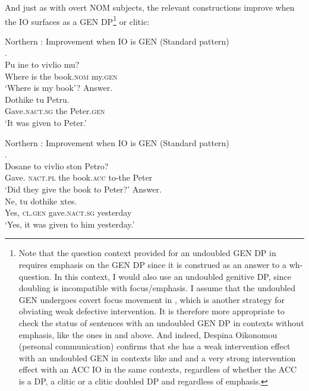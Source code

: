 \documentclass[output=paper]{LSP/langsci}
\begin{document}
And just as with overt NOM subjects, the relevant  constructions improve when the IO surfaces as a GEN DP\footnote{Note that the question context provided for an undoubled GEN DP in  requires emphasis on the GEN DP since it is construed as an answer to a wh-question. In this context, I would also use an undoubled genitive DP, since doubling is incompatible with focus/emphasis. I assume that the undoubled GEN undergoes covert focus movement in , which is another strategy for obviating weak defective intervention. It is therefore more appropriate to check the status of sentences with an undoubled GEN DP in contexts without emphasis, like the ones in  and  above. And indeed, Despina Oikonomou (personal communication) confirms that she has a weak intervention effect with an undoubled GEN in contexts like  and  and a very strong intervention effect with an ACC IO in the same contexts, regardless of whether the ACC is a DP, a clitic or a clitic doubled DP and regardless of emphasis.}  or clitic:

\ea%
\label{ex:anagnost:27}
Northern : Improvement when IO is GEN (Standard  pattern)\\
\ea\label{ex:anagnost:27b}
.\\   
\gll Pu ine to vivlio mu?\\
 Where   is the book.\textsc{nom} my.\textsc{gen}\\
\glt ‘Where is my book’?
\ex Answer.\\
\gll Dothike tu Petru.  \\
 Gave.\textsc{nact.sg} the  Peter.\textsc{gen}\\
\glt ‘It was given to Peter.’
\z
\z


\ea%
\label{ex:anagnost:28}
Northern : Improvement when IO is GEN (Standard  pattern)\\
\ea
{}.\\
\gll Dosane to vivlio ston Petro?\\
 Gave. \textsc{nact.pl} the book.\textsc{acc} to-the Peter\\
\glt ‘Did they give the book to Peter?’
\ex 
Answer.\\
\gll  Ne, tu  dothike xtes.  \\
 Yes, \textsc{cl}.\textsc{gen} gave.\textsc{nact.sg} yesterday      \\
\glt ‘Yes, it was given to him yesterday.’
\z\z
\end{document}
